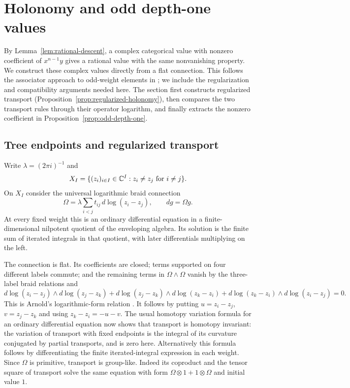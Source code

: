 \section{Holonomy and odd depth-one values}\label{sec:holonomy}

By Lemma~\ref{lem:rational-descent}, a complex categorical value with
nonzero coefficient of $x^{n-1}y$ gives a rational value with the same
nonvanishing property.  We construct these complex values directly
from a flat connection.
This follows the associator approach to odd-weight elements in
\cite[Proposition~6.3]{Drinfeld}; we include the regularization and
compatibility arguments needed here.  The section first constructs
regularized transport (Proposition~\ref{prop:regularized-holonomy}),
then compares the two transport rules through their operator logarithm,
and finally extracts the nonzero coefficient in
Proposition~\ref{prop:odd-depth-one}.

\subsection{Tree endpoints and regularized transport}
Write $\lambda=(2\pi i)^{-1}$ and
\[
 X_I=\{(z_i)_{i\in I}\in\mathbb C^I:z_i\ne z_j\text{ for }i\ne j\}.
\]
On $X_I$ consider the universal logarithmic braid connection
\cite[Section~1.3]{Kohno}
\begin{equation}\label{eq:holonomy-connection}
 \Omega=\lambda\sum_{i<j}t_{ij}\,d\log(z_i-z_j),
 \qquad dg=\Omega g.
\end{equation}
At every fixed weight this is an ordinary differential equation in a
finite-dimensional nilpotent quotient of the enveloping algebra.
Its solution is the finite sum of iterated integrals in that quotient,
with later differentials multiplying on the left.

The connection is flat.  Its coefficients are closed; terms supported
on four different labels commute; and the remaining terms in
$\Omega\wedge\Omega$ vanish by the three-label braid relations and
\[
 d\log(z_i-z_j)\wedge d\log(z_j-z_k)
 +d\log(z_j-z_k)\wedge d\log(z_k-z_i)
 +d\log(z_k-z_i)\wedge d\log(z_i-z_j)=0.
\]
This is Arnold's logarithmic-form relation \cite{Arnold}.
It follows by putting $u=z_i-z_j$, $v=z_j-z_k$ and using
$z_k-z_i=-u-v$.  The usual homotopy variation formula for an ordinary
differential equation now shows that transport is homotopy invariant:
the variation of transport with fixed endpoints is the integral of
its curvature conjugated by partial transports, and is zero here.
Alternatively this formula follows by differentiating the finite
iterated-integral expression in each weight.
Since $\Omega$ is primitive, transport is group-like.  Indeed its
coproduct and the tensor square of transport solve the same equation
with form $\Omega\otimes1+1\otimes\Omega$ and initial value $1$.

